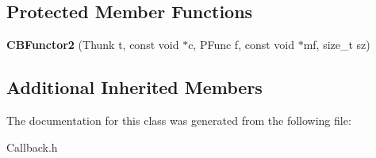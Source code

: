 \subsection*{Protected Member Functions}
\begin{DoxyCompactItemize}
\item 
{\bfseries C\+B\+Functor2} (Thunk t, const void $\ast$c, P\+Func f, const void $\ast$mf, size\+\_\+t sz)\label{classCBFunctor2_a29ed0870454c88ea38a030f4c1f341d1}

\end{DoxyCompactItemize}
\subsection*{Additional Inherited Members}


The documentation for this class was generated from the following file\+:\begin{DoxyCompactItemize}
\item 
Callback.\+h\end{DoxyCompactItemize}
